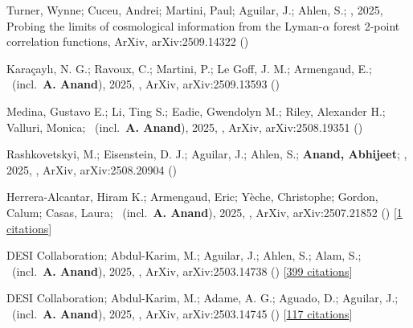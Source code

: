 \item[{\color{numcolor}\scriptsize10}] Turner, Wynne; Cuceu, Andrei; Martini, Paul; Aguilar, J.; Ahlen, S.; \etal, 2025, Probing the limits of cosmological information from the Lyman-${\ensuremath{\alpha}}$ forest 2-point correlation functions, ArXiv, arXiv:2509.14322 ()

\item[{\color{numcolor}\scriptsize9}] Kara{\c{c}}ayl{\i}, N. G.; Ravoux, C.; Martini, P.; Le Goff, J. M.; Armengaud, E.; \etal\ (incl.\ \textbf{A. Anand}), 2025, , ArXiv, arXiv:2509.13593 ()

\item[{\color{numcolor}\scriptsize8}] Medina, Gustavo E.; Li, Ting S.; Eadie, Gwendolyn M.; Riley, Alexander H.; Valluri, Monica; \etal\ (incl.\ \textbf{A. Anand}), 2025, , ArXiv, arXiv:2508.19351 ()

\item[{\color{numcolor}\scriptsize7}] Rashkovetskyi, M.; Eisenstein, D. J.; Aguilar, J.; Ahlen, S.; \textbf{Anand, Abhijeet}; \etal, 2025, , ArXiv, arXiv:2508.20904 ()

\item[{\color{numcolor}\scriptsize6}] Herrera-Alcantar, Hiram K.; Armengaud, Eric; Y{\`e}che, Christophe; Gordon, Calum; Casas, Laura; \etal\ (incl.\ \textbf{A. Anand}), 2025, , ArXiv, arXiv:2507.21852 () [\href{https://ui.adsabs.harvard.edu/abs/2025arXiv250721852H}{1 citations}]

\item[{\color{numcolor}\scriptsize5}] DESI Collaboration; Abdul-Karim, M.; Aguilar, J.; Ahlen, S.; Alam, S.; \etal\ (incl.\ \textbf{A. Anand}), 2025, , ArXiv, arXiv:2503.14738 () [\href{https://ui.adsabs.harvard.edu/abs/2025arXiv250314738D}{399 citations}]

\item[{\color{numcolor}\scriptsize4}] DESI Collaboration; Abdul-Karim, M.; Adame, A. G.; Aguado, D.; Aguilar, J.; \etal\ (incl.\ \textbf{A. Anand}), 2025, , ArXiv, arXiv:2503.14745 () [\href{https://ui.adsabs.harvard.edu/abs/2025arXiv250314745D}{117 citations}]


